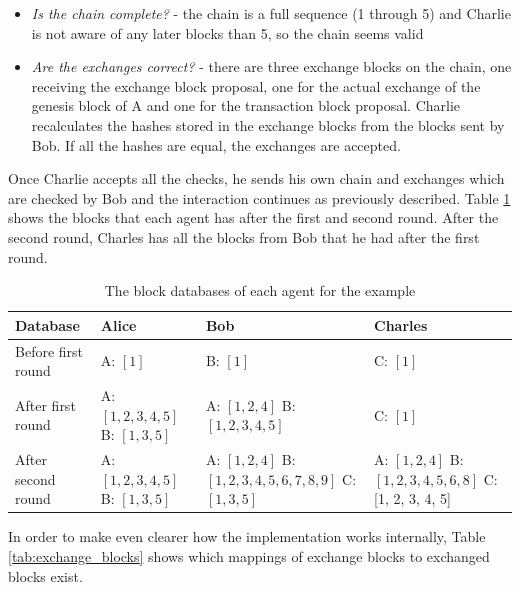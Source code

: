 \begin{itemize}
    \item \textit{Is the chain complete?} - the chain is a full sequence (1 through 5) and Charlie 
    is not aware of any later blocks than 5, so the chain seems valid
    \item \textit{Are the exchanges correct?} - there are three exchange blocks on the chain, one
    receiving the exchange block proposal, one for the actual exchange of the genesis block of A and
    one for the transaction block proposal. Charlie recalculates the hashes stored in the exchange 
    blocks from the blocks sent by Bob. If all the hashes are equal, the exchanges are accepted.
\end{itemize}

Once Charlie accepts all the checks, he sends his own chain and exchanges which are checked by Bob
and the interaction continues as previously described. Table \ref{tab:blocks_example} shows the
blocks that each agent has after the first and second round. After the second round, Charles has 
all the blocks from Bob that he had after the first round.

\begin{table}[h!]
    \centering
    \caption{The block databases of each agent for the example}
    \label{tab:blocks_example}
    \begin{tabular}{p{4cm}|p{3cm}|p{4cm}|p{3cm}}
        \toprule
        Database & Alice & Bob & Charles \\
        \midrule
        Before first round & A: $[1]$ & B: $[1]$ & C: $[1]$ \\ \hline 
        After first round & A: $[1, 2, 3, 4, 5]$ \newline B: $[1, 3, 5]$ & A: $[1, 2, 4]$ \newline B: $[1, 2, 3, 4, 5]$ & C: $[1]$ \\ \hline
        After second round &  A: $[1, 2, 3, 4, 5]$ \newline B: $[1, 3, 5]$ & A: $[1, 2, 4]$ \newline B: $[1, 2, 3, 4, 5, 6, 7, 8, 9]$ \newline C: $[1, 3, 5]$ & A: $[1, 2, 4]$ \newline B: $[1, 2, 3, 4, 5, 6, 8]$ \newline C: [1, 2, 3, 4, 5] \\
        \bottomrule
    \end{tabular}
\end{table}

In order to make even clearer how the implementation works internally, Table \ref{tab:exchange_blocks}
shows which mappings of exchange blocks to exchanged blocks exist.

